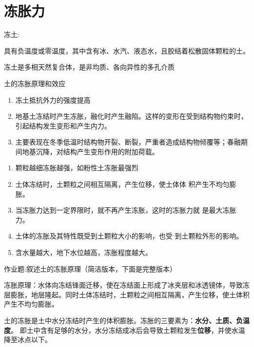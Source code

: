 \documentclass[12pt, a4paper, oneside, UTF8]{ctexbook}
\begin{document}
\section{冻胀力}

\begin{definition}
    冻土:

    具有负温度或零温度，其中含有冰、水汽、液态水，且胶结着松散固体颗粒的土。

    冻土是多相天然复合体，是非均质、各向异性的多孔介质
\end{definition}

\begin{corollary}
    土的冻胀原理和效应
    \begin{enumerate}
        \item 冻土抵抗外力的强度提高
        \item 地基土冻结时产生冻胀，融化时产生融陷。这样的变形在受到结构物约束时，引起结构发生变形和产生内力。
        \item 主要表现在冬季低温时结构物开裂、断裂，严重者造成结构物倾覆等；春融期间地基沉降，对结构产生变形作用的附加荷载。
    \end{enumerate}
\end{corollary}

\begin{enumerate}
    \item {\color{red}颗粒越细冻胀越强}，如粉性土冻胀最强烈
    \item 土体冻结时，土颗粒之间相互隔离，产生位移，使土体体
    积产生不均匀膨胀。
    \item 当冻胀力达到一定界限时，就不再产生冻胀，这时的冻胀力就
    是{\color{red}最大冻胀力}。
    \item 土体的冻胀及其特性既受到土颗粒大小的影响，也受
    到土颗粒外形的影响。
    \item {\color{red}含水量越大，地下水位越高，冻胀程度越大}。
\end{enumerate}

\begin{remark}
    作业题:叙述土的冻胀原理（简洁版本，下面是完整版本）

    冻胀原理：水体向冻结锋面迁移，使在冻结面上形成了冰夹层和冰透镜体，导致冻层膨胀，地层隆起。同时土体冻结时，土颗粒之间相互隔离，产生位移，使土体积产生不均匀膨胀。
\end{remark}

土的冻胀是土中水分冻结时产生的体积膨胀。冻胀的三要素为：\textbf{水分、土质、负温度}。  
即土中含有足够的水分，水分冻结成冰后会导致土颗粒发生\textbf{位移}，并使水温降至冰点以下。
\end{document}
